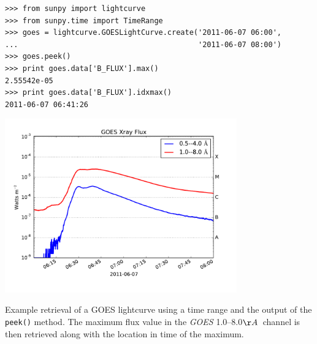 \begin{listing}[H]
\begin{verbatim}
>>> from sunpy import lightcurve
>>> from sunpy.time import TimeRange
>>> goes = lightcurve.GOESLightCurve.create('2011-06-07 06:00',
...                                         '2011-06-07 08:00')
>>> goes.peek()
>>> print goes.data['B_FLUX'].max()
2.55542e-05
>>> print goes.data['B_FLUX'].idxmax()
2011-06-07 06:41:26
\end{verbatim}
\begin{center}
\includegraphics[width=10cm]{goes_lightcurve.pdf}
\end{center}
\caption{Example retrieval of a GOES lightcurve
using a time range and the output of the 
\texttt{peek()} method. The maximum flux value in the \textit{GOES} 1.0--8.0$\AA$\ channel 
is then retrieved along with the location in time of the maximum.}
\label{code:goes_lc}
\end{listing}